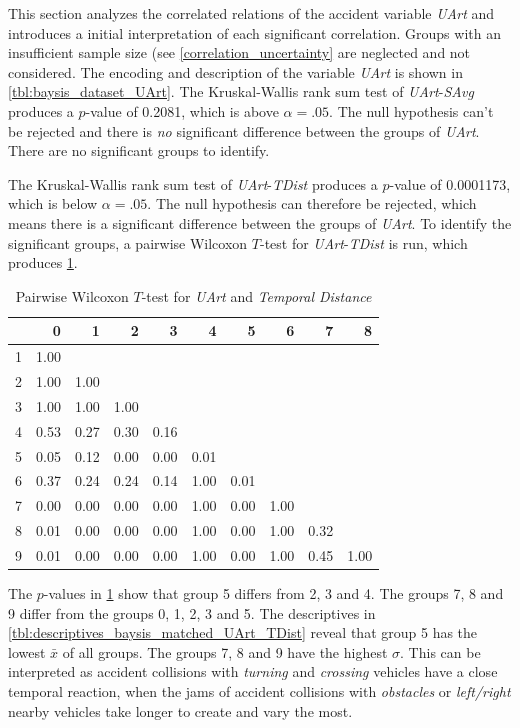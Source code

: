 This section analyzes the correlated relations of the accident variable \textit{UArt} and introduces a initial interpretation of each significant correlation. Groups with an insufficient sample size (see \cref{correlation_uncertainty} are neglected and not considered. The encoding and description of the variable \textit{UArt} is shown in \cref{tbl:baysis_dataset_UArt}. The Kruskal-Wallis rank sum test of \textit{UArt}-\textit{SAvg} produces a $p$-value of 0.2081, which is above $\alpha=.05$. The null hypothesis can't be rejected and there is \textit{no} significant difference between the groups of \textit{UArt}. There are no significant groups to identify.

The Kruskal-Wallis rank sum test of \textit{UArt}-\textit{TDist} produces a $p$-value of 0.0001173, which is below $\alpha=.05$. The null hypothesis can therefore be rejected, which means there is a significant difference between the groups of \textit{UArt}. To identify the significant groups, a pairwise Wilcoxon $T$-test for \textit{UArt}-\textit{TDist} is run, which produces \cref{tbl:wilcoxon_baysis_matched_UArt_TDist}. 
\begin{table}[ht]
	\small
	\centering
	\begin{tabular}{rrrrrrrrrr}
  		\toprule
		& 0 & 1 & 2 & 3 & 4 & 5 & 6 & 7 & 8 \\ 
		\midrule
		1 & 1.00 &  &  &  &  &  &  &  &  \\ 
		2 & 1.00 & 1.00 &  &  &  &  &  &  &  \\ 
		3 & 1.00 & 1.00 & 1.00 &  &  &  &  &  &  \\ 
		4 & 0.53 & 0.27 & 0.30 & 0.16 &  &  &  &  &  \\ 
		5 & 0.05 & 0.12 & 0.00 & 0.00 & 0.01 &  &  &  &  \\ 
		6 & 0.37 & 0.24 & 0.24 & 0.14 & 1.00 & 0.01 &  &  &  \\ 
		7 & 0.00 & 0.00 & 0.00 & 0.00 & 1.00 & 0.00 & 1.00 &  &  \\ 
		8 & 0.01 & 0.00 & 0.00 & 0.00 & 1.00 & 0.00 & 1.00 & 0.32 &  \\ 
		9 & 0.01 & 0.00 & 0.00 & 0.00 & 1.00 & 0.00 & 1.00 & 0.45 & 1.00 \\ 
		\bottomrule
	\end{tabular}
	\caption{Pairwise Wilcoxon $T$-test for \textit{UArt} and \textit{Temporal Distance}}
	\label{tbl:wilcoxon_baysis_matched_UArt_TDist}
\end{table}
The $p$-values in \cref{tbl:wilcoxon_baysis_matched_UArt_TDist} show that group 5 differs from 2, 3 and 4. The groups 7, 8 and 9 differ from the groups 0, 1, 2, 3 and 5. The descriptives in \cref{tbl:descriptives_baysis_matched_UArt_TDist} reveal that group 5 has the lowest $\bar{x}$ of all groups. The groups 7, 8 and 9 have the highest $\sigma$. This can be interpreted as accident collisions with \textit{turning} and \textit{crossing} vehicles have a close temporal reaction, when the jams of accident collisions with \textit{obstacles} or \textit{left/right} nearby vehicles take longer to create and vary the most.
